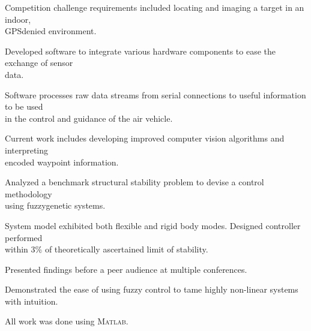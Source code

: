 \documentclass[letterpaper]{deedy-resume}
\begin{document}
\begin{minipage}[t]{\textwidth}
    \vspace*{2ex}
    \begin{compactitem}
        \item Competition challenge requirements included locating and imaging a target in an indoor,\\ GPS\textendash denied environment.
        \item Developed software to integrate various hardware components to ease the exchange of sensor\\ data.
        \item Software processes raw data streams from serial connections to useful information to be used\\ in the control and guidance of the air vehicle.
        \item Current work includes developing improved computer vision algorithms and interpreting\\ encoded waypoint information.
    \end{compactitem}
    
    \vspace*{2ex}
    \begin{compactitem}
        \item Analyzed a benchmark structural stability problem to devise a control methodology\\  using fuzzy\textendash genetic systems.
        \item System model exhibited both flexible and rigid body modes. Designed controller performed\\ within 3\% of theoretically ascertained limit of stability.
        \item Presented findings before a peer audience at multiple conferences.
        \item Demonstrated the ease of using fuzzy control to tame highly non-linear systems with intuition.
        \item All work was done using \textsc{Matlab}.
    \end{compactitem}    

    \vspace*{3em}

\end{minipage}
\end{document}
